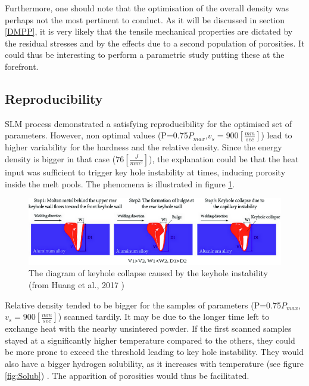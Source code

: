 Furthermore, one should note that the optimisation of the overall density was perhaps not the most pertinent to conduct. As it will be discussed in section \ref{DMPP}, it is very likely that the tensile mechanical properties are dictated by the residual stresses and by the effects due to a second population of porosities. It could thus be interesting to perform a parametric study putting these at the forefront.\\ 

\subsection{Reproducibility}

SLM process demonstrated a satisfying reproducibility for the optimised set of parameters. However, non optimal values (P=0.75$P_{max}$,$v_s=900 [\frac{mm}{sec}]$) lead to higher variability for the hardness and the relative density. Since the energy density is bigger in that case ($76[\frac{J}{mm^3}]$), the explanation could be that the heat input was sufficient to trigger key hole instability at times, inducing porosity inside the melt pools. The phenomena is illustrated in figure \ref{fig:KHI}. \\

\begin{figure}[ht]
	\centering
	\centerline{\includegraphics[scale=0.52]{Images/KHI}}
	\decoRule
	\caption[The diagram of keyhole collapse caused by the keyhole instability.]{The diagram of keyhole collapse caused by the keyhole instability (from Huang et al., 2017 \parencite{Huang2017})}
	\label{fig:KHI}
\end{figure}

Relative density tended to be bigger for the samples of parameters (P=0.75$P_{max}$,$v_s=900 [\frac{mm}{sec}]$) scanned tardily. It may be due to the longer time left to exchange heat with the nearby unsintered powder. If the first scanned samples stayed at a significantly higher temperature compared to the others, they could be more prone to exceed the threshold leading to key hole instability. They would also have a bigger hydrogen solubility, as it increases with temperature (see figure \ref{fig:Solub}) \parencite{Verhaeghe}. The apparition of porosities would thus be facilitated. \\

